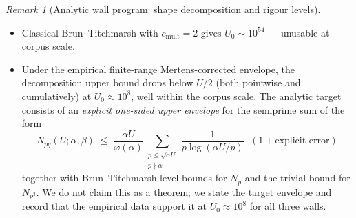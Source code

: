 \documentclass[11pt]{article}
\renewcommand{\_}{\origunderscore\allowbreak}
\theoremstyle{definition}
\theoremstyle{remark}
\newtheorem{remark}[theorem]{Remark}
\begin{document}
\begin{remark}[Analytic wall program: shape decomposition and rigour levels]
\begin{itemize}
        $H_{\alpha}(\sqrt{\alpha U})$ inside a one-sided semiprime
        envelope; the first-order expression is a leading
        approximation.
  \item Classical Brun--Titchmarsh with $c_{\mathrm{mult}}=2$ gives
        $U_{0}\sim 10^{54}$ --- unusable at corpus scale.
  \item Under the empirical finite-range Mertens-corrected envelope,
        the decomposition upper bound drops below $U/2$ (both
        pointwise and cumulatively) at $U_{0}\approx 10^{8}$, well
        within the corpus scale.  The analytic target consists of an
        \emph{explicit one-sided upper envelope} for the semiprime
        sum of the form
        \[
          N_{pq}(U;\alpha,\beta)
          \;\le\;
          \frac{\alpha U}{\varphi(\alpha)}
          \sum_{\substack{p\le\sqrt{\alpha U}\\p\nmid \alpha}}
          \frac{1}{p\log(\alpha U/p)}
          \cdot(1+\text{explicit error})
        \]
        together with Brun--Titchmarsh-level bounds for $N_{p}$ and the
        trivial bound for $N_{p^{3}}$.  We do not claim this as a
        theorem; we state the target envelope and record that the
        empirical data support it at $U_{0}\approx 10^{8}$ for all
        three walls.
\end{itemize}


\end{remark}
\end{document}
